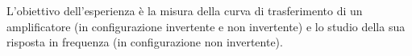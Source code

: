 L'obiettivo dell'esperienza è la misura della curva di trasferimento di un amplificatore (in configurazione invertente e non invertente) e 
lo studio della sua risposta in frequenza (in configurazione non invertente).
